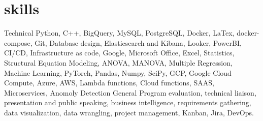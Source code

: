 \documentclass[]{twentysecondcv}
\begin{document}
\section{skills}
	\begin{twentyshort}
	\twentyitemshort
	{Technical}
	{Python, C++, BigQuery, MySQL, PostgreSQL, Docker, LaTex, docker-compose, Git, Database design, Elasticsearch and Kibana, Looker, PowerBI, CI/CD, Infrastructure as code, Google, Microsoft Office, Excel, Statistics, Structural Equation Modeling, ANOVA, MANOVA, Multiple Regression, Machine Learning, PyTorch, Pandas, Numpy, SciPy, GCP, Google Cloud Compute, Azure, AWS, Lambda functions, Cloud functions, SAAS, Microservices, Anomoly Detection}
	\twentyitemshort
	{General}
	{Program evaluation, technical liaison, presentation and public speaking, business intelligence, requirements gathering, data visualization, data wrangling, project management, Kanban, Jira, DevOps.}
	\end{twentyshort}

\end{document}
